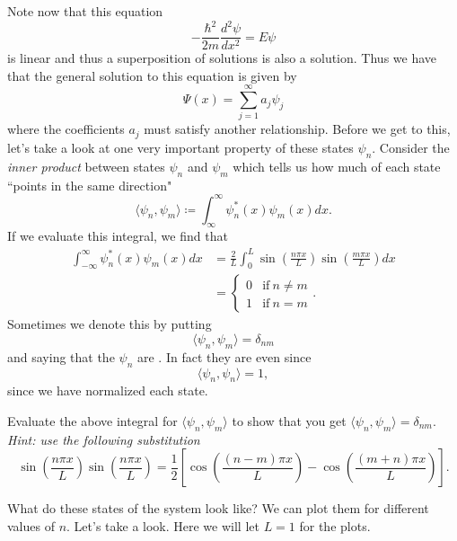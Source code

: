 Note now that this equation
\[
-\frac{\hbar^2}{2m}\frac{d^2 \psi}{dx^2}=E\psi
\]
is linear and thus a superposition of solutions is also a solution.  Thus we have that the general solution to this equation is given by
\[
\Psi(x) = \sum_{j=1}^\infty a_j \psi_j
\]
where the coefficients $a_j$ must satisfy another relationship. Before we get to this, let's take a look at one very important property of these states $\psi_n$.  Consider the \emph{inner product} between states $\psi_n$ and $\psi_m$ which tells us how much of each state ``points in the same direction"
\[
\langle \psi_n,\psi_m \rangle \coloneqq \int_{\infty}^\infty \psi_n^*(x) \psi_m(x) dx.
\]
If we evaluate this integral, we find that
\begin{align*}
    \int_{-\infty}^\infty \psi_n^*(x)\psi_m(x)dx&= \frac{2}{L}\int_0^L \sin\left( \frac{n\pi x}{L}\right)\sin\left( \frac{m\pi x}{L}\right)dx\\
    &= \begin{cases} 0 &\textrm{if}~ n\neq m\\
    1 & \textrm{if}~ n=m\end{cases}.
\end{align*}
Sometimes we denote this by putting
\[
\langle \psi_n,\psi_m\rangle = \delta_{nm}
\]
and saying that the $\psi_n$ are . In fact they are even  since
\[
\langle \psi_n,\psi_n\rangle = 1,
\]
since we have normalized each state.
\begin{exercise}
Evaluate the above integral for $\langle \psi_n, \psi_m \rangle$ to show that you get $\langle \psi_n,\psi_m\rangle = \delta_{nm}$.  \emph{Hint: use the following substitution} 
\[
\sin\left(\frac{n\pi x}{L}\right)\sin\left(\frac{n\pi x}{L}\right) =\frac{1}{2}\left[ \cos\left( \frac{(n-m)\pi x}{L} \right) - \cos\left( \frac{(m+n)\pi x}{L}\right)\right].
\]
\end{exercise}
What do these states of the system look like? We can plot them for different values of $n$. Let's take a look. Here we will let $L=1$ for the plots.
